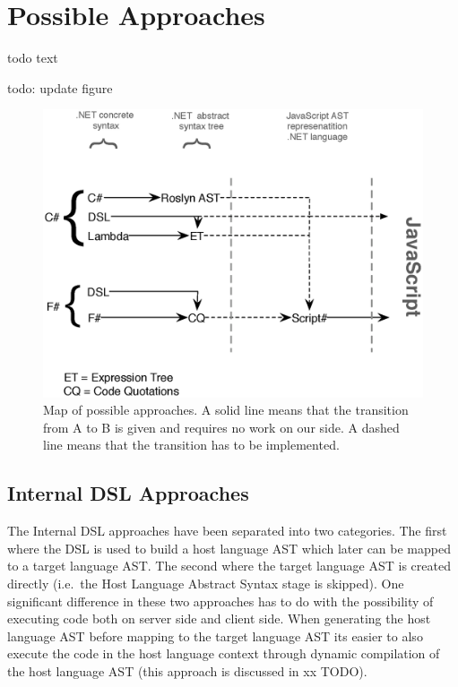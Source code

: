 \section{Possible Approaches} %
\label{sec:possible_approaches}
	todo text

	todo: update figure
					\begin{figure}[H]
			\begin{center}
				\centerline{\includegraphics[width=14cm]{resources/images/approachComparison.eps}}
			\end{center}
			\caption{Map of possible approaches. A solid line means that the transition from A to B is given and requires no work on our side. A dashed line means that the transition has to be implemented.}
			\label{approachMap}
		\end{figure}

	\subsection{Internal DSL Approaches} %
	\label{ssub:internal_dsl_approaches}

		The Internal DSL approaches have been separated into two categories. The first where the DSL is used to build a host language AST which later can be mapped to a target language AST. The second where the target language AST is created directly (i.e.\ the Host Language Abstract Syntax stage is skipped). One significant difference in these two approaches has to do with the possibility of executing code both on server side and client side. When generating the host language AST before mapping to the target language AST its easier to also execute the code in the host language context through dynamic compilation of the host language AST (this approach is discussed in xx TODO).
	
